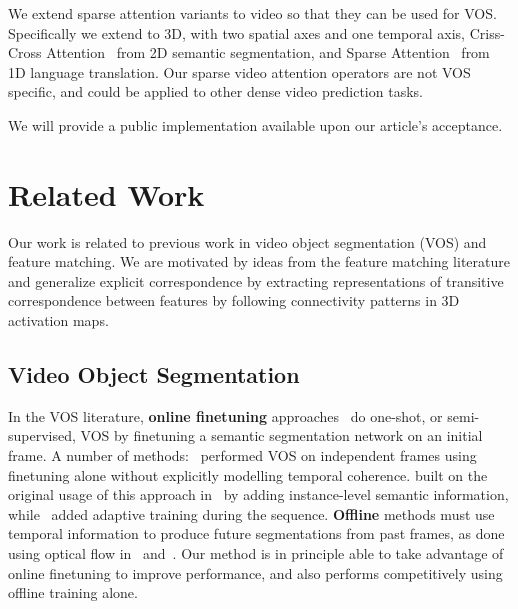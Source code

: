 We extend sparse attention variants to video so that they can be used for VOS.
Specifically we extend to 3D, with two spatial axes and one temporal axis,
Criss-Cross Attention~\citep{huang2018ccnet} from 2D semantic segmentation, and
Sparse Attention~\citep{child2019sparsetransformer} from 1D language
translation.
Our sparse video attention operators are not VOS specific, and could be applied
to other dense video prediction tasks.




We will provide a public implementation available upon our article's acceptance.


\section{Related Work}

Our work is related to previous work in video object segmentation (VOS) and
feature matching.
We are motivated by ideas from the feature matching literature and
generalize explicit correspondence by extracting representations of transitive
correspondence between features by following connectivity patterns in 3D
activation maps.


\subsection{Video Object Segmentation}

In the VOS literature, \textbf{online finetuning}
approaches~\citep{bao2018cnn,caelles2017one,maninis2018video,voigtlaender2017online,hu2018motion,khoreva2017learning,li2018video}
do one-shot, or semi-supervised, VOS by finetuning a semantic segmentation
network on an initial frame.
A number of methods:~\citep{cheng2018fast,caelles2017one,maninis2018video,voigtlaender2017online}
performed VOS on independent frames using finetuning alone without explicitly
modelling temporal coherence.
\citet{maninis2018video} built on the original usage of this approach
in~\citet{caelles2017one} by adding instance-level semantic information,
while~\citet{voigtlaender2017online} added adaptive training during the
sequence.
\textbf{Offline} methods must use temporal information to produce future
segmentations from past frames, as done using optical flow
in~\citet{jang2017online} and~\citet{tsai2016video}.
Our method is in principle able to take advantage of online finetuning to
improve performance, and also performs competitively using offline training
alone.

